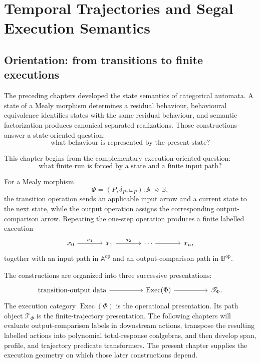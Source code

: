 \chapter{Temporal Trajectories and Segal Execution Semantics}
\label{ch:temporal-trajectories-segal-execution}

\section{Orientation: from transitions to finite executions}
\label{sec:temporal-from-mealy-executions}

The preceding chapters developed the state semantics of categorical automata.
A state of a Mealy morphism determines a residual behaviour, behavioural
equivalence identifies states with the same residual behaviour, and semantic
factorization produces canonical separated realizations. Those constructions
answer a state-oriented question:
\[
    \text{what behaviour is represented by the present state?}
\]

This chapter begins from the complementary execution-oriented question:
\[
    \text{what finite run is forced by a state and a finite input path?}
\]

For a Mealy morphism
\[
    \Phi=(P,\delta_P,\omega_P):
    \mathbb A\rightsquigarrow\mathbb B,
\]
the transition operation sends an applicable input arrow and a current state
to the next state, while the output operation assigns the corresponding
output-comparison arrow. Repeating the one-step operation produces a finite
labelled execution
\[
\begin{tikzcd}[column sep=large]
    x_0
        \arrow[r, "{a_1}"]
    &
    x_1
        \arrow[r, "{a_2}"]
    &
    \cdots
        \arrow[r]
    &
    x_n,
\end{tikzcd}
\]
together with an input path in \(\mathbb A^{\mathrm{op}}\) and an
output-comparison path in \(\mathbb B^{\mathrm{op}}\).

The constructions are organized into three successive presentations:
\[
\begin{tikzcd}[column sep=huge]
    \text{transition-output data}
        \arrow[r]
    &
    \operatorname{Exec}(\Phi)
        \arrow[r]
    &
    \mathscr T_\Phi.
\end{tikzcd}
\]
The execution category \(\operatorname{Exec}(\Phi)\) is the operational
presentation.  Its path object \(\mathscr T_\Phi\) is the finite-trajectory
presentation.  The following chapters will evaluate output-comparison labels
in downstream actions, transpose the resulting labelled actions into
polynomial total-response coalgebras, and then develop span, profile, and
trajectory predicate transformers.  The present chapter supplies the
execution geometry on which those later constructions depend.

